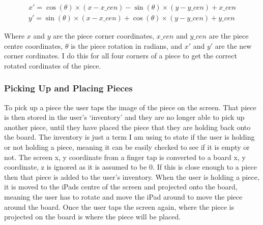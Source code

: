 \documentclass{article}
\begin{document}
\begin{equation*}
\begin{aligned}
x' = \cos(\theta) \times (x - x\_cen) - \sin(\theta) \times (y - y\_cen) + x\_cen\\ 
y' = \sin(\theta) \times (x - x\_cen) + \cos(\theta) \times (y - y\_cen) + y\_cen
\end{aligned}
\end{equation*}

Where $x$ and $y$ are the piece corner coordinates, $x\_cen$ and $y\_cen$ are
the piece centre coordinates, $\theta$ is the piece rotation in radians, and
$x'$ and $y'$ are the new corner cordinates. I do this for all four corners of a
piece to get the correct rotated cordinates of the piece.

\subsubsection{Picking Up and Placing Pieces}
To pick up a piece the user taps the image of the piece on the screen. That
piece is then stored in the user's `inventory' and they are no longer able to
pick up another piece, until they have placed the piece that they are holding
back onto the board. The inventory is just a term I am using to state if the
user is holding or not holding a piece, meaning it can be easily checked to see
if it is empty or not. The screen x, y coordinate from a finger tap is converted
to a board x, y coordinate, z is ignored as it is assumed to be 0. If this is
close enough to a piece then that piece is added to the user's inventory. When
the user is holding a piece, it is moved to the iPads centre of the screen and
projected onto the board, meaning the user has to rotate and move the iPad
around to move the piece around the board. Once the user taps the screen again,
where the piece is projected on the board is where the piece will be placed.

\end{document}
